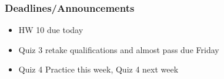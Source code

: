 
\begin{frame}
    \frametitle{Deadlines/Announcements}
\begin{itemize}
            \item HW 10 due today
            \item Quiz 3 retake qualifications and almost pass due Friday
            \item Quiz 4 Practice this week, Quiz 4 next week
        \end{itemize}
\end{frame}
